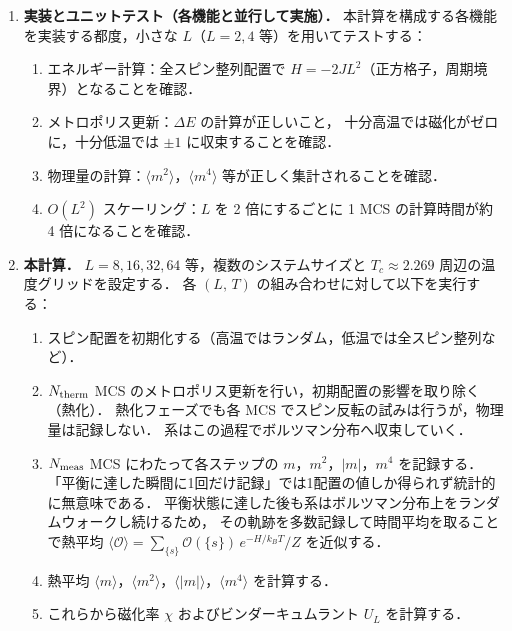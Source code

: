 \documentclass[12pt,a4paper]{ltjsarticle}
\begin{document}
\begin{enumerate}
  \item \textbf{実装とユニットテスト（各機能と並行して実施）．}
        本計算を構成する各機能を実装する都度，小さな $L$（$L=2, 4$ 等）を用いてテストする：
        \begin{enumerate}
          \item エネルギー計算：全スピン整列配置で $H = -2JL^2$（正方格子，周期境界）となることを確認．
          \item メトロポリス更新：$\Delta E$ の計算が正しいこと，
                十分高温では磁化がゼロに，十分低温では $\pm 1$ に収束することを確認．
          \item 物理量の計算：$\langle m^2\rangle$，$\langle m^4\rangle$ 等が正しく集計されることを確認．
          \item $O(L^2)$ スケーリング：$L$ を 2 倍にするごとに 1 MCS の計算時間が約 4 倍になることを確認．
        \end{enumerate}

  \item \textbf{本計算．}
        $L = 8, 16, 32, 64$ 等，複数のシステムサイズと $T_c \approx 2.269$ 周辺の温度グリッドを設定する．
        各 $(L,\, T)$ の組み合わせに対して以下を実行する：
        \begin{enumerate}
          \item スピン配置を初期化する（高温ではランダム，低温では全スピン整列など）．
          \item $N_{\rm therm}$ MCS のメトロポリス更新を行い，初期配置の影響を取り除く（熱化）．
                熱化フェーズでも各 MCS でスピン反転の試みは行うが，物理量は記録しない．
                系はこの過程でボルツマン分布へ収束していく．
          \item $N_{\rm meas}$ MCS にわたって各ステップの $m$，$m^2$，$|m|$，$m^4$ を記録する．
                「平衡に達した瞬間に1回だけ記録」では1配置の値しか得られず統計的に無意味である．
                平衡状態に達した後も系はボルツマン分布上をランダムウォークし続けるため，
                その軌跡を多数記録して時間平均を取ることで熱平均
                $\langle \mathcal{O} \rangle = \sum_{\{s\}} \mathcal{O}(\{s\})\,e^{-H/k_BT} / Z$
                を近似する．
          \item 熱平均 $\langle m \rangle$，$\langle m^2 \rangle$，$\langle |m| \rangle$，$\langle m^4 \rangle$ を計算する．
          \item これらから磁化率 $\chi$ およびビンダーキュムラント $U_L$ を計算する．
        \end{enumerate}


\end{enumerate}
\end{document}
